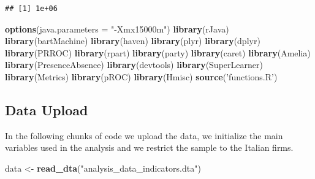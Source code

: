 \documentclass[]{article}
\newenvironment{Shaded}{\begin{snugshade}}{\end{snugshade}}
\newcommand{\DataTypeTok}[1]{\textcolor[rgb]{0.13,0.29,0.53}{#1}}
\newcommand{\KeywordTok}[1]{\textcolor[rgb]{0.13,0.29,0.53}{\textbf{#1}}}
\newcommand{\NormalTok}[1]{#1}
\newcommand{\StringTok}[1]{\textcolor[rgb]{0.31,0.60,0.02}{#1}}
\begin{document}
\begin{verbatim}
## [1] 1e+06
\end{verbatim}

\begin{Shaded}
\begin{Highlighting}[]
\KeywordTok{options}\NormalTok{(}\DataTypeTok{java.parameters =} \StringTok{"-Xmx15000m"}\NormalTok{)}
\KeywordTok{library}\NormalTok{(rJava)}
\KeywordTok{library}\NormalTok{(bartMachine)}
\KeywordTok{library}\NormalTok{(haven)}
\KeywordTok{library}\NormalTok{(plyr)}
\KeywordTok{library}\NormalTok{(dplyr)}
\KeywordTok{library}\NormalTok{(PRROC)}
\KeywordTok{library}\NormalTok{(rpart)}
\KeywordTok{library}\NormalTok{(party)}
\KeywordTok{library}\NormalTok{(caret)}
\KeywordTok{library}\NormalTok{(Amelia)}
\KeywordTok{library}\NormalTok{(PresenceAbsence)}
\KeywordTok{library}\NormalTok{(devtools)}
\KeywordTok{library}\NormalTok{(SuperLearner)}
\KeywordTok{library}\NormalTok{(Metrics)}
\KeywordTok{library}\NormalTok{(pROC)}
\KeywordTok{library}\NormalTok{(Hmisc)}
\KeywordTok{source}\NormalTok{(}\StringTok{'functions.R'}\NormalTok{)}
\end{Highlighting}
\end{Shaded}

\hypertarget{data-upload}{%
\subsection{Data Upload}\label{data-upload}}

In the following chunks of code we upload the data, we initialize the
main variables used in the analysis and we restrict the sample to the
Italian firms.

\begin{Shaded}
\begin{Highlighting}[]
\NormalTok{data <-}\StringTok{ }\KeywordTok{read_dta}\NormalTok{(}\StringTok{"analysis_data_indicators.dta"}\NormalTok{)}
\end{Highlighting}
\end{Shaded}
\end{document}
